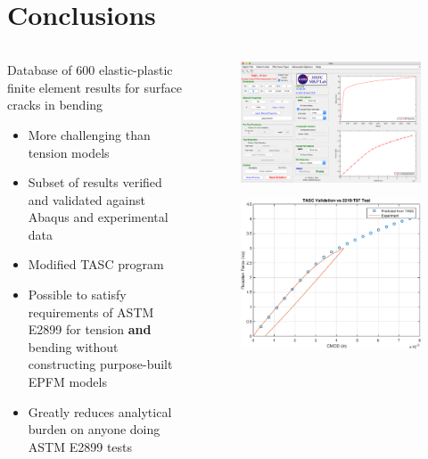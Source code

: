 \section{Conclusions}

\begin{frame}
\begin{columns}
\begin{column}{0.6\textwidth}
Database of 600 elastic-plastic finite element results for surface cracks in bending
\begin{itemize}
\item More challenging than tension models
\item Subset of results verified and validated against Abaqus and experimental data
\item Modified TASC program
\item Possible to satisfy requirements of ASTM E2899 for tension {\bfseries and} bending without constructing purpose-built EPFM models
\item Greatly reduces analytical burden on anyone doing ASTM E2899 tests
\end{itemize}
\end{column}
\begin{column}{0.3\textwidth}
\begin{figure}[tbp]
\centering
\includegraphics[width=0.8\columnwidth]{tasc-force-cmod-validation}
\end{figure}
\begin{figure}[tbp]
\centering
\includegraphics[width=0.75\columnwidth]{experimental-validation}

\end{figure}
\end{column}
\end{columns}
\end{frame}
